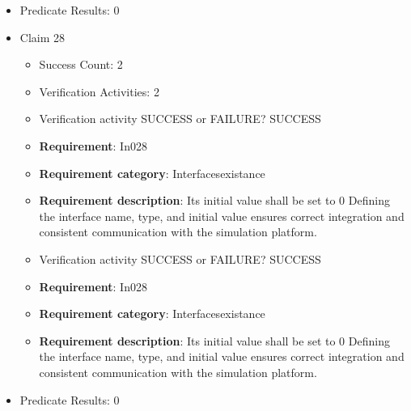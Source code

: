 \documentclass{article}
\begin{document}
\begin{itemize}
\begin{itemize}
					\item Verification activity SUCCESS or FAILURE? SUCCESS
		
						\item \textbf{Requirement}: In027 
						\item \textbf{Requirement category}: Interfacesexistance 
						\item \textbf{Requirement description}: Its initial value shall be set to 0 Defining the interface name, type, and initial value ensures correct integration and consistent communication with the simulation platform.
					
				\end{itemize}
				
									    
				\item Predicate Results: 0

  				  \item Claim 28
				\begin{itemize}
			    	\item Success Count: 2 
			    	\item Verification Activities: 2
					\item Verification activity SUCCESS or FAILURE? SUCCESS
		
						\item \textbf{Requirement}: In028 
						\item \textbf{Requirement category}: Interfacesexistance 
						\item \textbf{Requirement description}: Its initial value shall be set to 0 Defining the interface name, type, and initial value ensures correct integration and consistent communication with the simulation platform.
					
					\item Verification activity SUCCESS or FAILURE? SUCCESS
		
						\item \textbf{Requirement}: In028 
						\item \textbf{Requirement category}: Interfacesexistance 
						\item \textbf{Requirement description}: Its initial value shall be set to 0 Defining the interface name, type, and initial value ensures correct integration and consistent communication with the simulation platform.
					
				\end{itemize}
				
									    
				\item Predicate Results: 0


\end{itemize}
\end{document}
